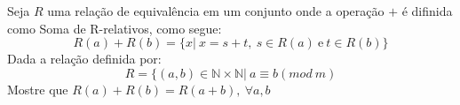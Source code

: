 \item 
		Seja $R$ uma relação de equivalência em um conjunto onde a operação $+$ é difinida como {\sc Soma de R-relativos}, como segue:
		\[
				R(a) + R(b) = \{x|\ x=s+t,\ s\in R(a)\ \text{e}\ t\in R(b)\}
		\]
Dada a relação definida por:
\[R=\{(a,b)\in \mathbb{N}\times \mathbb{N}|\ a\equiv b (mod\ m) \]
Mostre que $R(a)+R(b)=R(a+b),\ \forall a,b$				
